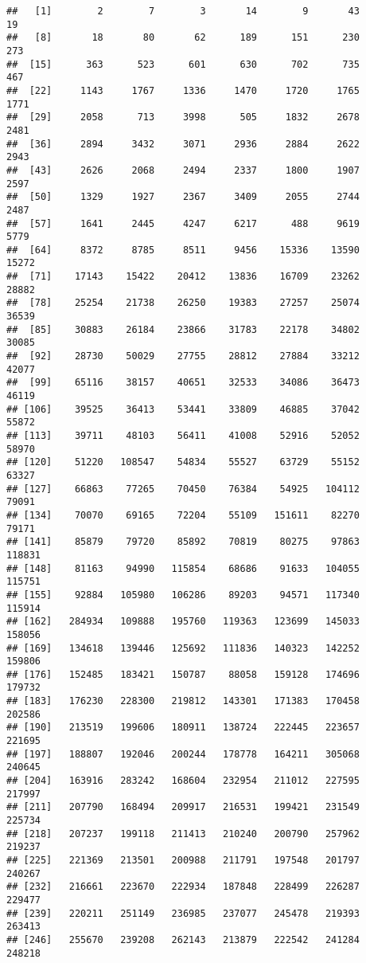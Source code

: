 \documentclass[]{article}
\begin{document}
\begin{verbatim}
##   [1]        2        7        3       14        9       43       19
##   [8]       18       80       62      189      151      230      273
##  [15]      363      523      601      630      702      735      467
##  [22]     1143     1767     1336     1470     1720     1765     1771
##  [29]     2058      713     3998      505     1832     2678     2481
##  [36]     2894     3432     3071     2936     2884     2622     2943
##  [43]     2626     2068     2494     2337     1800     1907     2597
##  [50]     1329     1927     2367     3409     2055     2744     2487
##  [57]     1641     2445     4247     6217      488     9619     5779
##  [64]     8372     8785     8511     9456    15336    13590    15272
##  [71]    17143    15422    20412    13836    16709    23262    28882
##  [78]    25254    21738    26250    19383    27257    25074    36539
##  [85]    30883    26184    23866    31783    22178    34802    30085
##  [92]    28730    50029    27755    28812    27884    33212    42077
##  [99]    65116    38157    40651    32533    34086    36473    46119
## [106]    39525    36413    53441    33809    46885    37042    55872
## [113]    39711    48103    56411    41008    52916    52052    58970
## [120]    51220   108547    54834    55527    63729    55152    63327
## [127]    66863    77265    70450    76384    54925   104112    79091
## [134]    70070    69165    72204    55109   151611    82270    79171
## [141]    85879    79720    85892    70819    80275    97863   118831
## [148]    81163    94990   115854    68686    91633   104055   115751
## [155]    92884   105980   106286    89203    94571   117340   115914
## [162]   284934   109888   195760   119363   123699   145033   158056
## [169]   134618   139446   125692   111836   140323   142252   159806
## [176]   152485   183421   150787    88058   159128   174696   179732
## [183]   176230   228300   219812   143301   171383   170458   202586
## [190]   213519   199606   180911   138724   222445   223657   221695
## [197]   188807   192046   200244   178778   164211   305068   240645
## [204]   163916   283242   168604   232954   211012   227595   217997
## [211]   207790   168494   209917   216531   199421   231549   225734
## [218]   207237   199118   211413   210240   200790   257962   219237
## [225]   221369   213501   200988   211791   197548   201797   240267
## [232]   216661   223670   222934   187848   228499   226287   229477
## [239]   220211   251149   236985   237077   245478   219393   263413
## [246]   255670   239208   262143   213879   222542   241284   248218

\end{verbatim}
\end{document}
